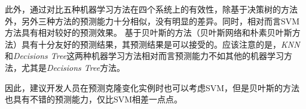 此外，通过对比五种机器学习方法在四个系统上的有效性，除基于决策树的方法外，另外三种方法的预测能力十分相似，没有明显的差异。同时，相对而言SVM方法具有相对较好的预测效果。%
基于贝叶斯的方法（贝叶斯网络和朴素贝叶斯方法）具有十分友好的预测结果，其预测结果是可以接受的。应该注意的是，{\em KNN}和{\em Decisions Tree}这两种机器学习方法相对而言预测能力不如其他的机器学习方法，尤其是{\em Decisions Tree}方法。

因此，建议开发人员在预测克隆变化实例时也可以考虑SVM，但是贝叶斯的方法也具有不错的预测能力，仅比SVM相差一点点。



